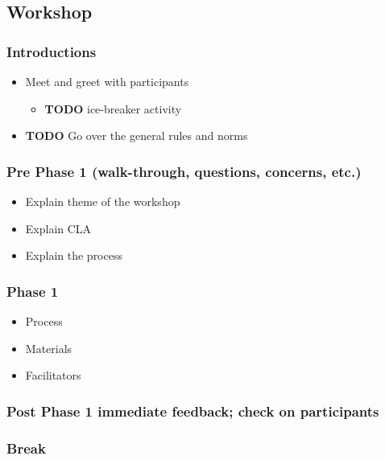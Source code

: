 \documentclass[12pt]{article}
\begin{document}
\subsection*{Workshop}
\label{sec:org100602c}
\subsubsection*{Introductions}
\label{sec:org46861f6}
\begin{itemize}
\item Meet and greet with participants
\label{sec:org87e26ec}
\begin{itemize}
\item {\bfseries\sffamily TODO} ice-breaker activity
\label{sec:org42ebb32}
\end{itemize}
\item {\bfseries\sffamily TODO} Go over the general rules and norms
\label{sec:org7fa2b7e}
\end{itemize}
\subsubsection*{Pre Phase 1 (walk-through, questions, concerns, etc.)}
\label{sec:org886d998}
\begin{itemize}
\item Explain theme of the workshop
\label{sec:org261b677}
\item Explain CLA
\label{sec:orga266c3a}
\item Explain the process
\label{sec:org48e50af}
\end{itemize}
\subsubsection*{Phase 1}
\label{sec:orgc51fd67}
\begin{itemize}
\item Process
\label{sec:org383e9e5}
\item Materials
\label{sec:orgab10565}
\item Facilitators
\label{sec:orgbacf37e}
\end{itemize}
\subsubsection*{Post Phase 1 immediate feedback; check on participants}
\label{sec:org60caf8d}
\subsubsection*{Break}
\label{sec:orga079529}
\end{document}
